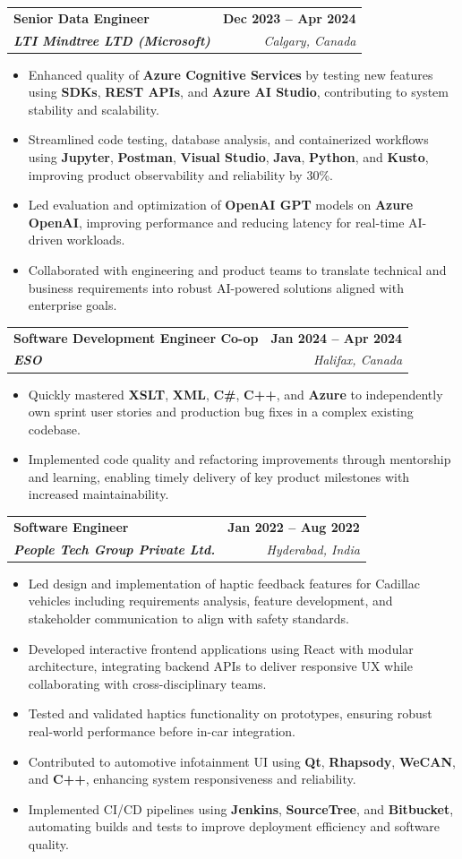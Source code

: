 \documentclass[letterpaper,11pt]{article}
\makeatletter
\newcommand{\resumeItem}[1]{
  \item\small{
    {#1 \vspace{-2pt}}
  }
}
\newcommand{\resumeSubheading}[4]{
  \vspace{-2pt}\item
    \begin{tabular*}{1.0\textwidth}[t]{l@{\extracolsep{\fill}}r}
      \textbf{#1} & \textbf{\small #2} \\
      \textit{\small#3} & \textit{\small #4} \\
    \end{tabular*}\vspace{-7pt}
}
\newcommand{\resumeItemListStart}{\begin{itemize}}
\newcommand{\resumeItemListEnd}{\end{itemize}\vspace{-5pt}}
\makeatother
\begin{document}
    \resumeSubheading
      {\textbf{Senior Data Engineer}}{\textbf{Dec 2023 -- Apr 2024}}
      {\textbf{LTI Mindtree LTD (Microsoft)}}{Calgary, Canada}
      \resumeItemListStart
        \resumeItem{Enhanced quality of \textbf{Azure Cognitive Services} by testing new features using \textbf{SDKs}, \textbf{REST APIs}, and \textbf{Azure AI Studio}, contributing to system stability and scalability.}
        \resumeItem{Streamlined code testing, database analysis, and containerized workflows using \textbf{Jupyter}, \textbf{Postman}, \textbf{Visual Studio}, \textbf{Java}, \textbf{Python}, and \textbf{Kusto}, improving product observability and reliability by 30\%.}
        \resumeItem{Led evaluation and optimization of \textbf{OpenAI GPT} models on \textbf{Azure OpenAI}, improving performance and reducing latency for real-time AI-driven workloads.}
        \resumeItem{Collaborated with engineering and product teams to translate technical and business requirements into robust AI-powered solutions aligned with enterprise goals.}
      \resumeItemListEnd
    
    \resumeSubheading
      {\textbf{Software Development Engineer Co-op}}{\textbf{Jan 2024 -- Apr 2024}}
      {\textbf{ESO}}{Halifax, Canada}
      \resumeItemListStart
        \resumeItem{Quickly mastered \textbf{XSLT}, \textbf{XML}, \textbf{C\#}, \textbf{C++}, and \textbf{Azure} to independently own sprint user stories and production bug fixes in a complex existing codebase.}
        \resumeItem{Implemented code quality and refactoring improvements through mentorship and learning, enabling timely delivery of key product milestones with increased maintainability.}
      \resumeItemListEnd

    \resumeSubheading
      {\textbf{Software Engineer}}{\textbf{Jan 2022 -- Aug 2022}}
      {\textbf{People Tech Group Private Ltd.}}{Hyderabad, India}
      \resumeItemListStart
        \resumeItem{Led design and implementation of haptic feedback features for Cadillac vehicles including requirements analysis, feature development, and stakeholder communication to align with safety standards.}
        \resumeItem{Developed interactive frontend applications using React with modular architecture, integrating backend APIs to deliver responsive UX while collaborating with cross-disciplinary teams.}
        \resumeItem{Tested and validated haptics functionality on prototypes, ensuring robust real-world performance before in-car integration.}
        \resumeItem{Contributed to automotive infotainment UI using \textbf{Qt}, \textbf{Rhapsody}, \textbf{WeCAN}, and \textbf{C++}, enhancing system responsiveness and reliability.}
        \resumeItem{Implemented CI/CD pipelines using \textbf{Jenkins}, \textbf{SourceTree}, and \textbf{Bitbucket}, automating builds and tests to improve deployment efficiency and software quality.}
      \resumeItemListEnd
\end{document}
